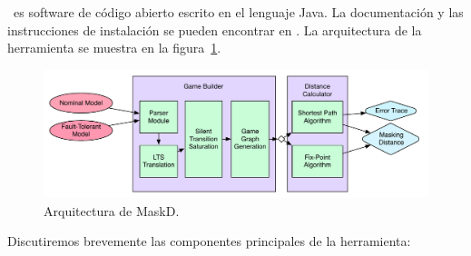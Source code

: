\MaskD~es software de código abierto escrito en el lenguaje \textsf{Java}. La documentación y las instrucciones de instalación se pueden encontrar en \cite{MaskD}. La arquitectura de la herramienta se muestra en la figura~\ref{fig:arch}.
\begin{figure}[t]
    \centering
    \includegraphics[scale=0.50]{Figs/architecture-eps-converted-to.pdf}
    \caption{Arquitectura de \textsf{MaskD}.}\label{fig:arch}
\end{figure}
    Discutiremos brevemente las componentes principales de la herramienta:
